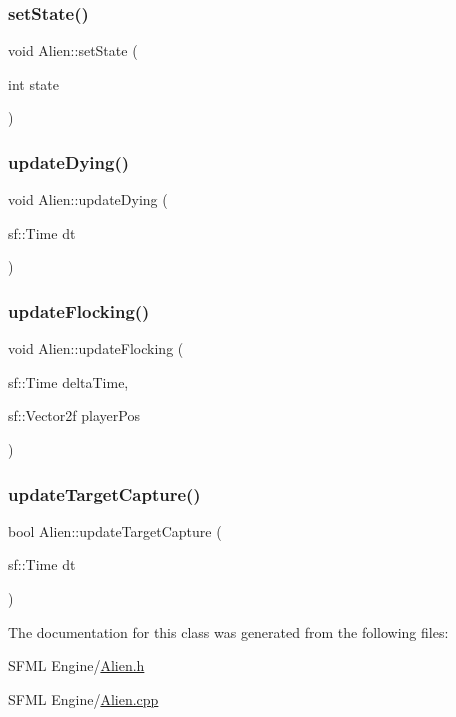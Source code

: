 \mbox{\label{class_alien_aead215fe05108897f31e12c9e58b0d90}} 
\subsubsection{\texorpdfstring{set\+State()}{setState()}}
{\footnotesize\ttfamily void Alien\+::set\+State (\begin{DoxyParamCaption}\item[{int}]{state }\end{DoxyParamCaption})}

\mbox{\label{class_alien_aa85a70c1e7ed8d7d728df94ad47b83a2}} 
\subsubsection{\texorpdfstring{update\+Dying()}{updateDying()}}
{\footnotesize\ttfamily void Alien\+::update\+Dying (\begin{DoxyParamCaption}\item[{sf\+::\+Time}]{dt }\end{DoxyParamCaption})}

\mbox{\label{class_alien_a37c8acacf468919027cb84593a0fc284}} 
\subsubsection{\texorpdfstring{update\+Flocking()}{updateFlocking()}}
{\footnotesize\ttfamily void Alien\+::update\+Flocking (\begin{DoxyParamCaption}\item[{sf\+::\+Time}]{delta\+Time,  }\item[{sf\+::\+Vector2f}]{player\+Pos }\end{DoxyParamCaption})}

\mbox{\label{class_alien_a6081c8a068679e203e6e920b9197e4de}} 
\subsubsection{\texorpdfstring{update\+Target\+Capture()}{updateTargetCapture()}}
{\footnotesize\ttfamily bool Alien\+::update\+Target\+Capture (\begin{DoxyParamCaption}\item[{sf\+::\+Time}]{dt }\end{DoxyParamCaption})}



The documentation for this class was generated from the following files\+:\begin{DoxyCompactItemize}
\item 
S\+F\+M\+L Engine/\hyperlink{_alien_8h}{Alien.\+h}\item 
S\+F\+M\+L Engine/\hyperlink{_alien_8cpp}{Alien.\+cpp}\end{DoxyCompactItemize}
